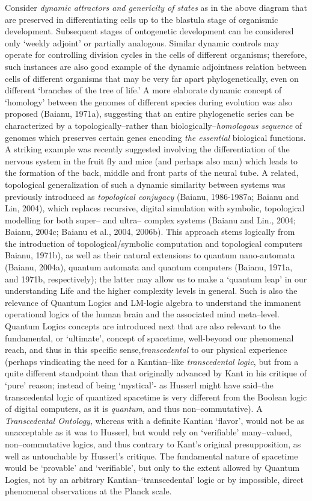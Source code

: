 \documentclass[12pt]{article}
\theoremstyle{plain}
\theoremstyle{definition}
\theoremstyle{plain}
\numberwithin{equation}{section}
\begin{document}
Consider {\em dynamic attractors and genericity of states} as in the above diagram that are preserved in differentiating cells up to the blastula stage of organismic development. Subsequent stages of ontogenetic development can be considered only `weekly adjoint' or partially analogous. Similar dynamic controls may operate for controlling division cycles in the cells of different organisms; therefore, such instances are also good example of the dynamic adjointness relation between cells of different organisms that may be very far apart phylogenetically, even on different `branches of the tree of life.'  A more elaborate dynamic concept of `homology' between the genomes of different species during evolution was also proposed (Baianu, 1971a), suggesting that an entire phylogenetic series can be characterized by a topologically--rather than biologically--\emph{homologous sequence} of genomes which preserves certain genes encoding \emph{the essential} biological functions. A striking example was recently suggested involving the differentiation of the nervous system in the fruit fly and mice (and perhaps also man) which leads to the formation of the back, middle and front parts of the neural tube. A related, topological generalization of such a dynamic similarity between systems was previously introduced as \emph{topological conjugacy }(Baianu, 1986-1987a; Baianu and Lin, 2004), which replaces recursive, digital simulation with symbolic, topological modelling for both super-- and ultra-- complex systems (Baianu and Lin., 2004; Baianu, 2004c; Baianu et al., 2004, 2006b). This approach stems logically from the introduction of topological/symbolic computation and topological computers Baianu, 1971b), as well as their natural extensions to quantum nano-automata (Baianu, 2004a), quantum automata and quantum computers (Baianu, 1971a, and 1971b, respectively); the latter may allow us to make a `quantum leap' in our understanding Life and the higher complexity levels in general. Such is also the relevance of Quantum Logics and LM-logic algebra to
understand the immanent operational logics of the human brain and the associated mind meta--level. Quantum Logics concepts are introduced next that are also relevant to the fundamental, or `ultimate', concept of spacetime, well-beyond our phenomenal reach, and thus in this specific sense,\emph{transcedental} to our physical experience (perhaps vindicating the need for a Kantian--like \emph{transcedental logic}, but from a quite different standpoint than that originally advanced by Kant in his critique of `pure' reason; instead of being `mystical'- as Husserl might have said--the transcedental logic of quantized spacetime is very different from the Boolean logic of digital computers, as it is \emph{quantum}, and thus non--commutative).  A \emph{Transcedental Ontology}, whereas with a definite Kantian `flavor', would not be as unacceptable as it was to Husserl, but would rely on `verifiable' many--valued, non--commutative logics, and thus contrary to Kant's original presupposition, as well as untouchable by Husserl's critique. The fundamental nature of spacetime would be `provable' and `verifiable', but only to the extent allowed by Quantum Logics, not by an arbitrary Kantian--`transcedental' logic or by impossible, direct phenomenal observations at the Planck scale.

\end{document}
